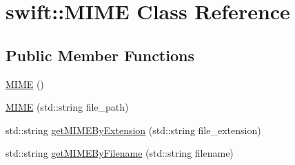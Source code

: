 \hypertarget{classswift_1_1_m_i_m_e}{\section{swift\-:\-:M\-I\-M\-E Class Reference}
\label{classswift_1_1_m_i_m_e}
}
\subsection*{Public Member Functions}
\begin{DoxyCompactItemize}
\item 
\hyperlink{classswift_1_1_m_i_m_e_abe227dcc4995486a0d4cb23235229c9d}{M\-I\-M\-E} ()
\item 
\hyperlink{classswift_1_1_m_i_m_e_a03f261db0ffec0cecba7f47bbabccc8b}{M\-I\-M\-E} (std\-::string file\-\_\-path)
\item 
std\-::string \hyperlink{classswift_1_1_m_i_m_e_a8cd77c1ecef3926ce7ccf3894d0b6c3e}{get\-M\-I\-M\-E\-By\-Extension} (std\-::string file\-\_\-extension)
\item 
std\-::string \hyperlink{classswift_1_1_m_i_m_e_a8f5cce5e4e5028f7bd769c1768d58f63}{get\-M\-I\-M\-E\-By\-Filename} (std\-::string filename)
\end{DoxyCompactItemize}


